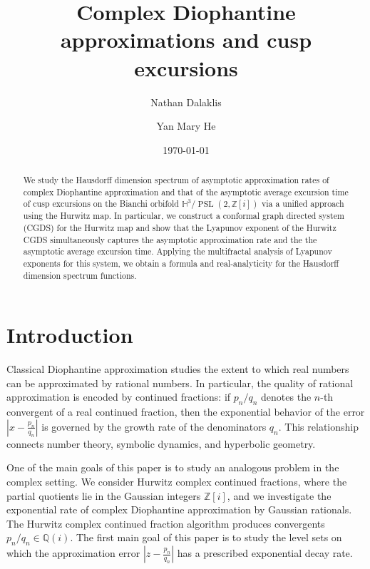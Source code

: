 \documentclass[11pt]{amsart}
\title[]{Complex Diophantine approximations and cusp excursions}
\date{\today}
\author[N. Dalaklis]{Nathan Dalaklis}
\author[Y.M. He]{Yan Mary He}
\theoremstyle{plain}
\theoremstyle{definition}
\renewcommand\~{\tilde}%
\numberwithin{equation}{section}
\begin{document}
\begin{abstract}
We study the Hausdorff dimension spectrum of asymptotic approximation rates of complex Diophantine approximation and
that of the asymptotic average excursion time of cusp excursions on the Bianchi orbifold $\mathbb H^3/\operatorname{PSL}(2,\mathbb Z[i])$ via a unified approach using the Hurwitz map. In particular, we construct a conformal graph directed system (CGDS) for the Hurwitz map and show that the Lyapunov exponent of the Hurwitz CGDS simultaneously captures
the asymptotic approximation rate and the the asymptotic average excursion time. 
Applying the multifractal analysis of Lyapunov exponents for this system,
we obtain a formula and
real-analyticity for the Hausdorff dimension spectrum functions.
\end{abstract}
	
\maketitle
	

\section{Introduction}
Classical Diophantine approximation studies the extent to which real numbers can be approximated by rational numbers. In particular, the quality of rational approximation is encoded by continued fractions: if $p_n/q_n$ denotes the $n$-th convergent of a real continued fraction, then the exponential behavior of the error
$\left|x-\frac{p_n}{q_n}\right|$
is governed by the growth rate of the denominators $q_n$. This relationship connects number theory, symbolic dynamics, and hyperbolic geometry.

One of the main goals of this paper is to study an analogous problem in the complex setting. We consider Hurwitz complex continued fractions, where the partial quotients lie in the Gaussian integers $\mathbb Z[i]$, and we investigate the exponential rate of complex Diophantine approximation by Gaussian rationals. 
The Hurwitz complex continued fraction algorithm produces convergents $p_n/q_n\in\mathbb Q(i)$. The first main goal of this paper is to study the level sets on which the approximation error
$\left|z-\frac{p_n}{q_n}\right|$
has a prescribed exponential decay rate.

\smallskip
\end{document}
